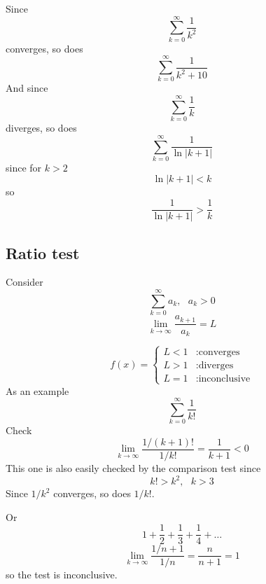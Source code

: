 \documentclass[11pt, oneside]{article}   	%
\begin{document}
Since
\[ \sum_{k=0}^{\infty} \frac{1}{k^2} \] 
converges, so does
\[ \sum_{k=0}^{\infty} \frac{1}{k^2 + 10} \] 
And since
\[ \sum_{k=0}^{\infty} \frac{1}{k} \] 
diverges, so does
\[ \sum_{k=0}^{\infty} \frac{1}{\ln|k+1|} \] 
since for $k>2$
\[ \ln|k+1| < k \]
 so
\[ \frac{1}{\ln|k+1|} > \frac{1}{k} \]

\subsection*{Ratio test}
Consider
\[ \sum_{k=0}^{\infty} a_k, \ \ \ a_k > 0 \] 
\[ \lim_{k \rightarrow \infty} \frac{a_{k+1}}{a_k} = L \]

\begin{displaymath}
   f(x) = \left\{
     \begin{array}{lr}
       L < 1 & : \text{converges} \\
       L > 1 & : \text{diverges} \\
	   L = 1 & : \text{inconclusive}
     \end{array}
   \right.
\end{displaymath} 
As an example
\[ \sum_{k=0}^{\infty} \frac{1}{k!} \]
Check
\[ \lim_{k \rightarrow \infty} \frac{1/(k+1)!}{1/k!} = \frac{1}{k+1} < 0 \]
This one is also easily checked by the comparison test since
\[ k! > k^2, \ \ \ k > 3 \]
Since $1/k^2$ converges, so does $1/k!$.

Or
\[ 1 + \frac{1}{2} + \frac{1}{3} + \frac{1}{4} + \dots \]
\[ \lim_{k \rightarrow \infty} \frac{1/n+1}{1/n} = \frac{n}{n+1} = 1 \]
so the test is inconclusive.
\end{document}
